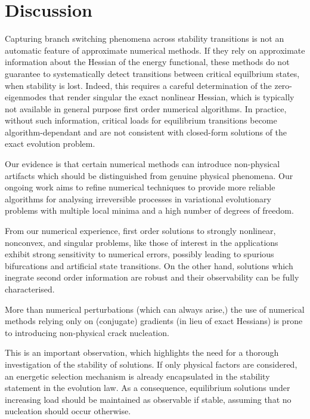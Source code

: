 
\section{Discussion} 
\label{sec:discussion}
    Capturing branch switching phenomena across stability transitions is not an automatic feature of approximate numerical methods. If they rely on approximate information about the Hessian of the energy functional, these methods do not guarantee to systematically detect transitions between critical equilbrium states, when stability is lost. 
Indeed, this requires a careful determination of the zero-eigenmodes that render singular the exact nonlinear Hessian, which is typically not available in general purpose first order numerical algorithms.
In practice, without such information, critical loads for equilibrium transitions become algorithm-dependant and are not consistent with closed-form solutions of the exact evolution problem.


Our evidence is that certain numerical methods can introduce non-physical artifacts which should be distinguished from genuine physical phenomena. Our ongoing work aims to refine numerical techniques to provide more reliable algorithms for analysing irreversible processes in variational evolutionary problems with multiple local minima and a high number of degrees of freedom.

From our numerical experience, first order solutions to strongly nonlinear, nonconvex, and singular problems, like those of interest in the applications exhibit strong sensitivity to numerical errors, possibly leading to spurious bifurcations and artificial state transitions. On the other hand, solutions which inegrate second order information are robust and their observability can be fully characterised.

More than numerical perturbations (which can always arise,) the use of numerical methods relying only on (conjugate) gradients (in lieu of exact Hessians) is prone to introducing non-physical crack nucleation.

This is an important observation, which highlights the need for a thorough investigation of the stability of solutions. 
If only physical factors are considered, an energetic selection mechanism is already encapsulated in the stability statement in the evolution law. As a consequence, equilibrium solutions under increasing load should be maintained as observable if stable, assuming that no nucleation should occur otherwise.

